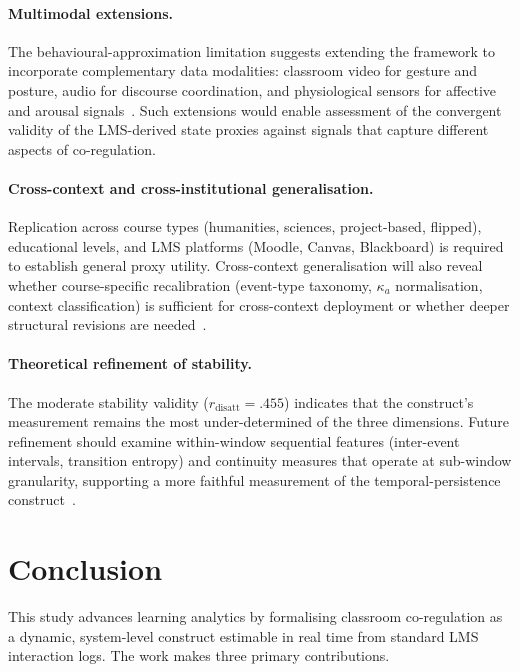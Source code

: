 \documentclass[preprint,12pt,authoryear]{elsarticle}
\begin{document}
\paragraph{Multimodal extensions.}
The behavioural-approximation limitation suggests extending the framework to incorporate complementary data modalities: classroom video for gesture and posture, audio for discourse coordination, and physiological sensors for affective and arousal signals~\citep{nguyen2023, molenaar2023, azevedo2013}. Such extensions would enable assessment of the convergent validity of the LMS-derived state proxies against signals that capture different aspects of co-regulation.

\paragraph{Cross-context and cross-institutional generalisation.}
Replication across course types (humanities, sciences, project-based, flipped), educational levels, and LMS platforms (Moodle, Canvas, Blackboard) is required to establish general proxy utility. Cross-context generalisation will also reveal whether course-specific recalibration (event-type taxonomy, $\kappa_a$ normalisation, context classification) is sufficient for cross-context deployment or whether deeper structural revisions are needed~\citep{pan2024, drugova2024}.

\paragraph{Theoretical refinement of stability.}
The moderate stability validity ($r_{\mathrm{disatt}} = .455$) indicates that the construct's measurement remains the most under-determined of the three dimensions. Future refinement should examine within-window sequential features (inter-event intervals, transition entropy) and continuity measures that operate at sub-window granularity, supporting a more faithful measurement of the temporal-persistence construct~\citep{molenaar2021, saint2023}.



\section{Conclusion}
\label{sec:conclusion}

This study advances learning analytics by formalising classroom co-regulation as a dynamic, system-level construct estimable in real time from standard LMS interaction logs. The work makes three primary contributions.
\end{document}
